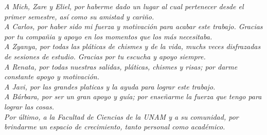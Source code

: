 \textit{A Mich, Zare y Eliel, por haberme dado un lugar al cual pertenecer desde
el primer semestre, as\'i como su amistad y cari\~{n}o.}\\

\textit{A Carlos, por haber sido mi fuerza y motivaci\'on para acabar este
trabajo. Gracias por tu compa\~{n}ia y apoyo en los momentos que los m\'as
necesitaba.}\\

\textit{A Zyanya, por todas las pl\'aticas de chismes y de la vida, muchs veces
disfrazadas de sesiones de estudio. Gracias por tu escucha y apoyo siempre.}\\

\textit{A Renata, por todas nuestras salidas, pl\'aticas, chismes y risas; por
darme constante apoyo y motivaci\'on.}\\

\textit{A Javi, por las grandes platicas y la ayuda para lograr este trabajo.}\\

\textit{A B\'arbara, por ser un gran apoyo y gu\'ia; por ense\~{n}arme la fuerza
que tengo para lograr las cosas.}\\

\textit{Por \'ultimo, a la Facultad de Ciencias de la UNAM y a su comunidad, por
brindarme un espacio de crecimiento, tanto personal como acad\'emico.}